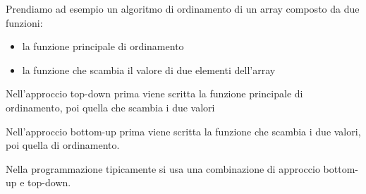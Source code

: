 Prendiamo ad esempio un algoritmo di ordinamento di un array composto da due funzioni:
\begin{itemize}
    \item la funzione principale di ordinamento
    \item la funzione che scambia il valore di due elementi dell'array
\end{itemize}
Nell'approccio top-down prima viene scritta la funzione principale di ordinamento, poi quella che scambia i due valori

Nell'approccio bottom-up prima viene scritta la funzione che scambia i due valori, poi quella di ordinamento.

Nella programmazione tipicamente si usa una combinazione di approccio bottom-up e top-down.

